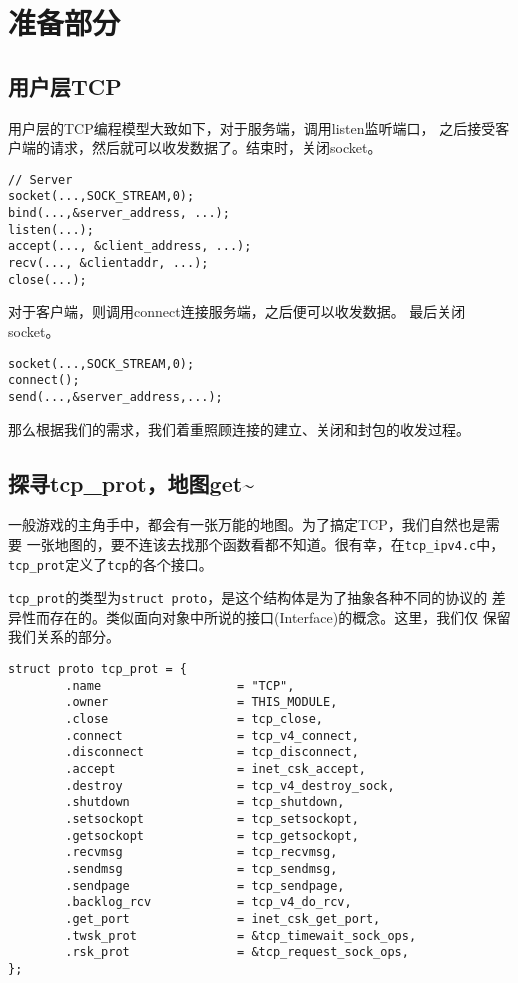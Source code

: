 \chapter{准备部分}

\minitoc

\section{用户层TCP}

用户层的TCP编程模型大致如下，对于服务端，调用listen监听端口，
之后接受客户端的请求，然后就可以收发数据了。结束时，关闭socket。

\begin{verbatim}
// Server
socket(...,SOCK_STREAM,0);
bind(...,&server_address, ...);
listen(...);
accept(..., &client_address, ...);
recv(..., &clientaddr, ...);
close(...);
\end{verbatim}

对于客户端，则调用connect连接服务端，之后便可以收发数据。
最后关闭socket。

\begin{verbatim}
socket(...,SOCK_STREAM,0);
connect();
send(...,&server_address,...);
\end{verbatim}

那么根据我们的需求，我们着重照顾连接的建立、关闭和封包的收发过程。

\section{探寻tcp\_prot，地图get\textasciitilde{}}

一般游戏的主角手中，都会有一张万能的地图。为了搞定TCP，我们自然也是需要
一张地图的，要不连该去找那个函数看都不知道。很有幸，在\texttt{tcp_ipv4.c}中，
\texttt{tcp_prot}定义了\texttt{tcp}的各个接口。

\texttt{tcp_prot}的类型为\texttt{struct proto}，是这个结构体是为了抽象各种不同的协议的
差异性而存在的。类似面向对象中所说的接口(Interface)的概念。这里，我们仅
保留我们关系的部分。

\begin{verbatim}
struct proto tcp_prot = {
        .name                   = "TCP",
        .owner                  = THIS_MODULE,
        .close                  = tcp_close,
        .connect                = tcp_v4_connect,
        .disconnect             = tcp_disconnect,
        .accept                 = inet_csk_accept,
        .destroy                = tcp_v4_destroy_sock,
        .shutdown               = tcp_shutdown,
        .setsockopt             = tcp_setsockopt,
        .getsockopt             = tcp_getsockopt,
        .recvmsg                = tcp_recvmsg,
        .sendmsg                = tcp_sendmsg,
        .sendpage               = tcp_sendpage,
        .backlog_rcv            = tcp_v4_do_rcv,
        .get_port               = inet_csk_get_port,
        .twsk_prot              = &tcp_timewait_sock_ops,
        .rsk_prot               = &tcp_request_sock_ops,
};
\end{verbatim}

